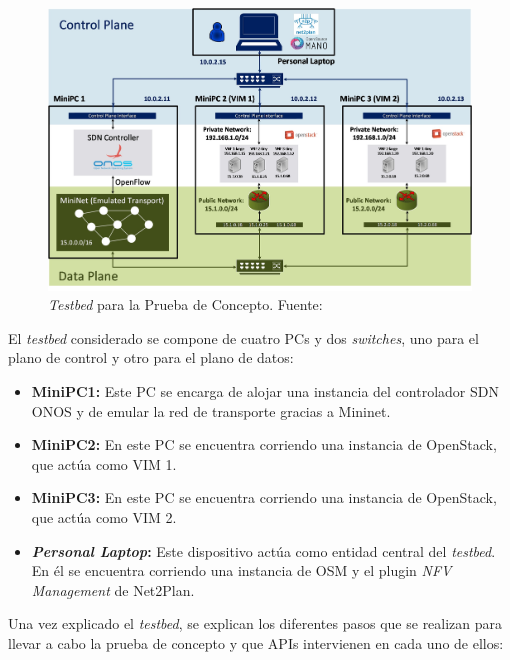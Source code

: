 \begin{figure}[!ht]
	\centering
	\includegraphics[width=0.9\linewidth]{imagenes/PoC_testbed}
	\caption{\textit{Testbed} para la Prueba de Concepto. Fuente:\cite{demoecocbib}}
	\label{fig:poctestbed}
\end{figure}

El \textit{testbed} considerado se compone de cuatro \acp{PC} y dos \textit{switches}, uno para el plano de control y otro para el plano de datos:

\begin{itemize}
	\item \textbf{Mini\ac{PC}1:} Este \ac{PC} se encarga de alojar una instancia del controlador \ac{SDN} \ac{ONOS} y de emular la red de transporte gracias a Mininet.
	
	\item \textbf{Mini\ac{PC}2:} En este \ac{PC} se encuentra corriendo una instancia de OpenStack, que actúa como \ac{VIM} 1.
	
	\item \textbf{Mini\ac{PC}3:} En este \ac{PC} se encuentra corriendo una instancia de OpenStack, que actúa como \ac{VIM} 2.
	
	\item \textbf{\textit{Personal Laptop}:} Este dispositivo actúa como entidad central del \textit{testbed}. En él se encuentra corriendo una instancia de \ac{OSM} y el plugin \textit{NFV Management} de Net2Plan.
\end{itemize}


Una vez explicado el \textit{testbed}, se explican los diferentes pasos que se realizan para llevar a cabo la prueba de concepto y que \acp{API} intervienen en cada uno de ellos:

